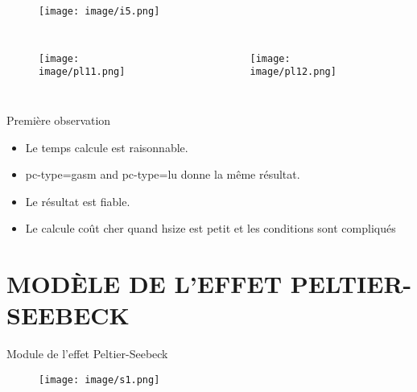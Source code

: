 \documentclass[11pt]{beamer}
\begin{document}
\begin{frame}

\begin{figure}
\texttt{[image: image/i5.png]}
\end{figure}
\end{frame}




\begin{frame}

\begin{columns}
\begin{figure}
\texttt{[image: image/pl11.png]}
\end{figure}
\begin{figure}
\texttt{[image: image/pl12.png]}
\end{figure}
\end{columns}

\end{frame}


\begin{frame}{Première observation}

\begin{itemize}
\item Le temps calcule est raisonnable.

\item pc-type=gasm and pc-type=lu donne la même résultat.

\item Le résultat est fiable.

\item Le calcule coût cher quand hsize est petit et les conditions sont compliqués

\end{itemize}

\end{frame}


\section{MODÈLE DE L'EFFET PELTIER-SEEBECK}


\begin{frame}{Module de l'effet Peltier-Seebeck}
\begin{figure}
\texttt{[image: image/s1.png]}
\end{figure}
\end{frame}
\end{document}
